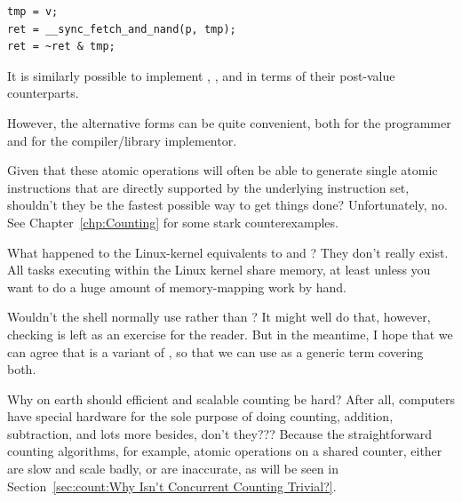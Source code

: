 \vspace{5pt}
\begin{minipage}[t]{\columnwidth}
\scriptsize
\begin{verbatim}
tmp = v;
ret = __sync_fetch_and_nand(p, tmp);
ret = ~ret & tmp;
\end{verbatim}
\end{minipage}
\vspace{5pt}

	It is similarly possible to implement ,
	, and 
	in terms of their post-value counterparts.

	However, the alternative forms can be quite convenient, both
	for the programmer and for the compiler/library implementor.

\QuickQ{}
	Given that these atomic operations will often be able to
	generate single atomic instructions that are directly
	supported by the underlying instruction set, shouldn't
	they be the fastest possible way to get things done?
\QuickA{}
	Unfortunately, no.
	See Chapter~\ref{chp:Counting} for some stark counterexamples.

\QuickQ{}
	What happened to the Linux-kernel equivalents to 
	and ?
\QuickA{}
	They don't really exist.
	All tasks executing within the Linux kernel share memory,
	at least unless you want to do a huge amount of memory-mapping
	work by hand.

\QuickQ{}
	Wouldn't the shell normally use  rather than
	?
\QuickA{}
	It might well do that, however, checking is left as an exercise
	for the reader.
	But in the meantime, I hope that we can agree that 
	is a variant of , so that we can use 
	as a generic term covering both.

\QuickQ{}
	Why on earth should efficient and scalable counting be hard?
	After all, computers have special hardware for the sole purpose
	of doing counting,
	addition, subtraction, and lots more besides, don't they???
\QuickA{}
	Because the straightforward counting algorithms, for example,
	atomic operations on a shared counter, either are slow and scale
	badly, or are inaccurate, as will be seen in
	Section~\ref{sec:count:Why Isn't Concurrent Counting Trivial?}.

